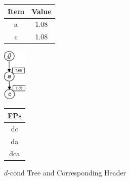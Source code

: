 %
\begin{figure}
\begin{minipage}{0.20\textwidth}
  \centering
	\begin{center}
	\begin{tabular}{ |c|c| } 
 	\hline
 		Item&Value\\ \hline\hline
 		a &  1.08  	\\ \hline
 		c &  1.08   	\\ \hline
 		
\end{tabular}
\end{center}  
\end{minipage}
  \hfill
\hfill
\begin{minipage}{0.10\textwidth}
  \centering
  \hfill
  \includegraphics[width=.65\textwidth, height=2.5cm]{images/D_COND.jpg}
  \hfill
\end{minipage}
\hfill
\begin{minipage}{0.15\textwidth}
  \centering
  
	\begin{center}
	\begin{tabular}{ |c| } 
 	\hline
 		FPs \\ \hline\hline
 		dc  	\\ \hline
 		da   	\\ \hline
 		dca   	\\ \hline
 		
\end{tabular}
\end{center}  
\end{minipage}
\caption{$d$-cond Tree and Corresponding Header}
\label{figure:d_cond}
\end{figure}
